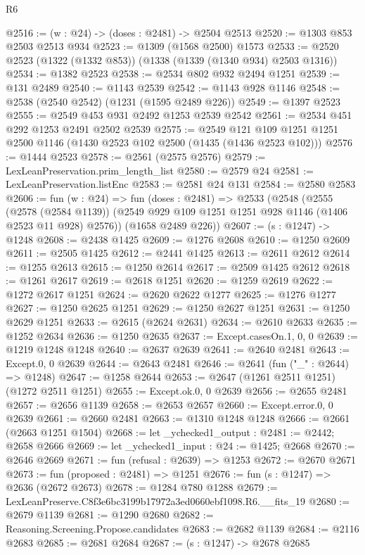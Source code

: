 \begin{lexlean}{R6}
\begin{coremodule}
@2516 := (w : @24) -> (doses : @2481) -> @2504 @2513
@2520 := @1303 @853 @2503 @2513 @934
@2523 := @1309 (@1568 @2500) @1573
@2533 := @2520 @2523 (@1322 (@1332 @853)) (@1338 (@1339 (@1340 @934) @2503 @1316))
@2534 := @1382 @2523
@2538 := @2534 @802 @932 @2494 @1251
@2539 := @131 @2489
@2540 := @1143 @2539
@2542 := @1143 @928 @1146
@2548 := @2538 (@2540 @2542) (@1231 (@1595 @2489 @226))
@2549 := @1397 @2523
@2555 := @2549 @453 @931 @2492 @1253 @2539 @2542
@2561 := @2534 @451 @292 @1253 @2491 @2502 @2539
@2575 := @2549 @121 @109 @1251 @1251 @2500 @1146 (@1430 @2523 @102 @2500 (@1435 (@1436 @2523 @102)))
@2576 := @1444 @2523
@2578 := @2561 (@2575 @2576)
@2579 := LexLeanPreservation.prim_length_list
@2580 := @2579 @24
@2581 := LexLeanPreservation.listEnc
@2583 := @2581 @24 @131
@2584 := @2580 @2583
@2606 := fun (w : @24) =>
  fun (doses : @2481) =>
  @2533
    (@2548
      (@2555
        (@2578 (@2584 @1139))
        (@2549 @929 @109 @1251 @1251 @928 @1146 (@1406 @2523 @11 @928) @2576))
      (@1658 @2489 @226))
@2607 := (s : @1247) -> @1248
@2608 := @2438 @1425
@2609 := @1276 @2608
@2610 := @1250 @2609
@2611 := @2505 @1425
@2612 := @2441 @1425
@2613 := @2611 @2612
@2614 := @1255 @2613
@2615 := @1250 @2614
@2617 := @2509 @1425 @2612
@2618 := @1261 @2617
@2619 := @2618 @1251
@2620 := @1259 @2619
@2622 := @1272 @2617 @1251
@2624 := @2620 @2622 @1277
@2625 := @1276 @1277
@2627 := @1250 @2625 @1251
@2629 := @1250 @2627 @1251
@2631 := @1250 @2629 @1251
@2633 := @2615 (@2624 @2631)
@2634 := @2610 @2633
@2635 := @1252 @2634
@2636 := @1250 @2635
@2637 := Except.casesOn.{1, 0, 0}
@2639 := @1219 @1248 @1248
@2640 := @2637 @2639
@2641 := @2640 @2481
@2643 := Except.{0, 0} @2639
@2644 := @2643 @2481
@2646 := @2641 (fun ("_" : @2644) => @1248)
@2647 := @1258 @2644
@2653 := @2647 (@1261 @2511 @1251) (@1272 @2511 @1251)
@2655 := Except.ok.{0, 0} @2639
@2656 := @2655 @2481
@2657 := @2656 @1139
@2658 := @2653 @2657
@2660 := Except.error.{0, 0} @2639
@2661 := @2660 @2481
@2663 := @1310 @1248 @1248
@2666 := @2661 (@2663 @1251 @1504)
@2668 := let _ychecked1_output : @2481 := @2442; @2658 @2666
@2669 := let _ychecked1_input : @24 := @1425; @2668
@2670 := @2646 @2669
@2671 := fun (refusal : @2639) => @1253
@2672 := @2670 @2671
@2673 := fun (proposed : @2481) => @1251
@2676 := fun (s : @1247) => @2636 (@2672 @2673)
@2678 := @1284 @780 @1288
@2679 := LexLeanPreserve.C8f3e6bc3199b17972a3ed0660ebf1098.R6.__fits_19
@2680 := @2679 @1139
@2681 := @1290 @2680
@2682 := Reasoning.Screening.Propose.candidates
@2683 := @2682 @1139
@2684 := @2116 @2683
@2685 := @2681 @2684
@2687 := (s : @1247) -> @2678 @2685

\end{coremodule}
\end{lexlean}
